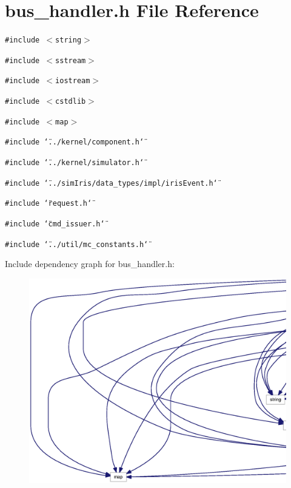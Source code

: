 \section{bus\_\-handler.h File Reference}
\label{bus__handler_8h}
{\tt \#include $<$string$>$}\par
{\tt \#include $<$sstream$>$}\par
{\tt \#include $<$iostream$>$}\par
{\tt \#include $<$cstdlib$>$}\par
{\tt \#include $<$map$>$}\par
{\tt \#include \char`\"{}../kernel/component.h\char`\"{}}\par
{\tt \#include \char`\"{}../kernel/simulator.h\char`\"{}}\par
{\tt \#include \char`\"{}../simIris/data\_\-types/impl/irisEvent.h\char`\"{}}\par
{\tt \#include \char`\"{}request.h\char`\"{}}\par
{\tt \#include \char`\"{}cmd\_\-issuer.h\char`\"{}}\par
{\tt \#include \char`\"{}../util/mc\_\-constants.h\char`\"{}}\par


Include dependency graph for bus\_\-handler.h:\nopagebreak
\begin{figure}[H]
\begin{center}
\leavevmode
\includegraphics[width=420pt]{bus__handler_8h__incl}
\end{center}
\end{figure}


